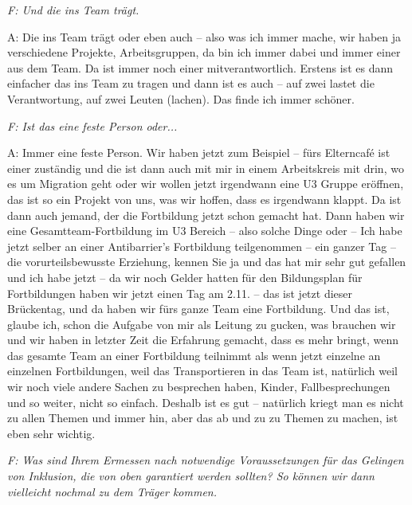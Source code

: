 \emph{F: Und die ins Team trägt.}

A: Die ins Team trägt oder eben auch -- also was ich immer mache, wir haben ja verschiedene Projekte, Arbeitsgruppen, da bin ich immer dabei und immer einer aus dem Team. Da ist immer noch einer mitverantwortlich. Erstens ist es dann einfacher das ins Team zu tragen und dann ist es auch – auf zwei lastet die Verantwortung, auf zwei Leuten (lachen). Das finde ich immer schöner.

\emph{F: Ist das eine feste Person oder...}

A: Immer eine feste Person. Wir haben jetzt zum Beispiel -- fürs Elterncafé ist einer zuständig und die ist dann auch mit mir in einem Arbeitskreis mit drin, wo es um Migration geht oder wir wollen jetzt irgendwann eine U3 Gruppe eröffnen, das ist so ein Projekt von uns, was wir hoffen, dass es irgendwann klappt. Da ist dann auch jemand, der die Fortbildung jetzt schon gemacht hat. Dann haben wir eine Gesamtteam-Fortbildung im U3 Bereich -- also solche Dinge oder -- Ich habe jetzt selber an einer Antibarrier's Fortbildung teilgenommen -- ein ganzer Tag -- die vorurteilsbewusste Erziehung, kennen Sie ja und das hat mir sehr gut gefallen und ich habe jetzt -- da wir noch Gelder hatten für den Bildungsplan für Fortbildungen haben wir jetzt einen Tag am 2.11. – das ist jetzt dieser Brückentag, und da haben wir fürs ganze Team eine Fortbildung. Und das ist, glaube ich, schon die Aufgabe von mir als Leitung zu gucken, was brauchen wir und wir haben in letzter Zeit die Erfahrung gemacht, dass es mehr bringt, wenn das gesamte Team an einer Fortbildung teilnimmt als wenn jetzt einzelne an einzelnen Fortbildungen, weil das Transportieren in das Team ist, natürlich weil wir noch viele andere Sachen zu besprechen haben, Kinder, Fallbesprechungen und so weiter, nicht so einfach. Deshalb ist es gut -- natürlich kriegt man es nicht zu allen Themen und immer hin, aber das ab und zu zu Themen zu machen, ist eben sehr wichtig. 

\emph{F: Was sind Ihrem Ermessen nach notwendige Voraussetzungen für das Gelingen von Inklusion, die von oben garantiert werden sollten? So können wir dann vielleicht nochmal zu dem Träger kommen.}

